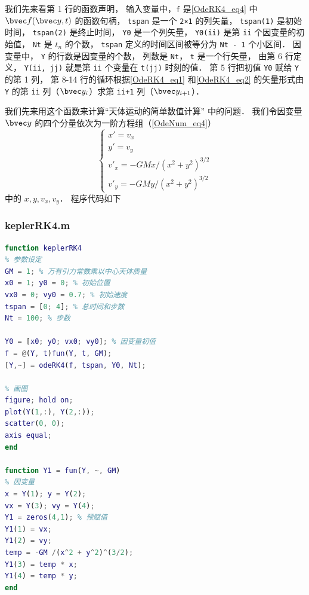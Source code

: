 我们先来看第 1 行的函数声明， 输入变量中，\lstinline|f| 是\autoref{OdeRK4_eq4} 中 $\bvec f(\bvec y, t)$ 的函数句柄， \lstinline|tspan| 是一个 \lstinline|2×1| 的列矢量， \lstinline|tspan(1)| 是初始时间， \lstinline|tspan(2)| 是终止时间， \lstinline|Y0| 是一个列矢量， \lstinline|Y0(ii)| 是第 \lstinline|ii| 个因变量的初始值， \lstinline|Nt| 是 $t_n$ 的个数， \lstinline|tspan| 定义的时间区间被等分为 \lstinline|Nt - 1| 个小区间． 因变量中， \lstinline|Y| 的行数是因变量的个数， 列数是 \lstinline|Nt|， \lstinline|t| 是一个行矢量， 由第 6 行定义， \lstinline|Y(ii, jj)| 就是第 \lstinline|ii| 个变量在 \lstinline|t(jj)| 时刻的值． 第 5 行把初值 \lstinline|Y0| 赋给 \lstinline|Y| 的第 1 列， 第 8-14 行的循环根据\autoref{OdeRK4_eq1} 和\autoref{OdeRK4_eq2} 的矢量形式由 \lstinline|Y| 的第 \lstinline|ii| 列（$\bvec y_i$）求第 \lstinline|ii+1| 列（$\bvec y_{i+1}$）．

我们先来用这个函数来计算“天体运动的简单数值计算” 中的问题． 我们令因变量 $\bvec y$ 的四个分量依次为一阶方程组（\autoref{OdeNum_eq4}）
\begin{equation}\label{OdeRK4_eq5}
\begin{cases}
x' = v_x\\
y' = v_y\\
v'_x = -GMx/(x^2 + y^2)^{3/2}\\
v'_y = -GMy/(x^2 + y^2)^{3/2}
\end{cases}
\end{equation}
中的 $x, y, v_x, v_y$． 程序代码如下

\subsubsection{keplerRK4.m}
\begin{lstlisting}[language=matlab]
function keplerRK4
% 参数设定
GM = 1; % 万有引力常数乘以中心天体质量
x0 = 1; y0 = 0; % 初始位置
vx0 = 0; vy0 = 0.7; % 初始速度
tspan = [0; 4]; % 总时间和步数
Nt = 100; % 步数

Y0 = [x0; y0; vx0; vy0]; % 因变量初值
f = @(Y, t)fun(Y, t, GM);
[Y,~] = odeRK4(f, tspan, Y0, Nt);

% 画图
figure; hold on;
plot(Y(1,:), Y(2,:));
scatter(0, 0);
axis equal;
end

function Y1 = fun(Y, ~, GM)
% 因变量
x = Y(1); y = Y(2);
vx = Y(3); vy = Y(4);
Y1 = zeros(4,1); % 预赋值
Y1(1) = vx;
Y1(2) = vy;
temp = -GM /(x^2 + y^2)^(3/2);
Y1(3) = temp * x;
Y1(4) = temp * y;
end
\end{lstlisting}

